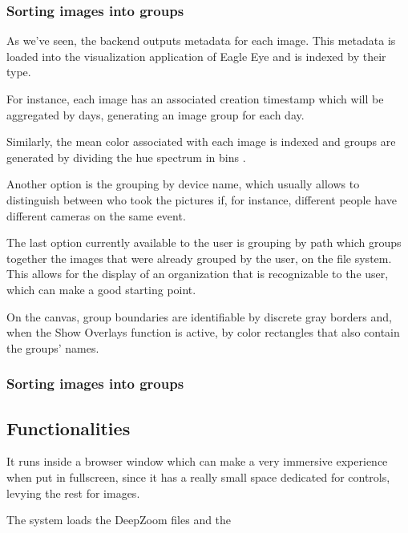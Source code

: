 \subsubsection{Sorting images into groups}

As we've seen, the backend outputs metadata for each image. This metadata is loaded into the visualization application of Eagle Eye and is indexed by their type.

For instance, each image has an associated creation timestamp which will be aggregated by days, generating an image group for each day.

Similarly, the mean color associated with each image is indexed and groups are generated by dividing the hue spectrum in bins .

Another option is the grouping by device name, which usually allows to distinguish between who took the pictures if, for instance, different people have different cameras on the same event.

The last option currently available to the user is grouping by path which groups together the images that were already grouped by the user, on the file system. This allows for the display of an organization that is recognizable to the user, which can make a good starting point.

On the canvas, group boundaries are identifiable by discrete gray borders and, when the Show Overlays function is active, by color rectangles that also contain the groups' names.


\subsubsection{Sorting images into groups}




\subsection{Functionalities}





It runs inside a browser window which can make a very immersive experience when put in fullscreen, since it has a really small space dedicated for controls, levying the rest for images.


The system loads the DeepZoom files and the 


